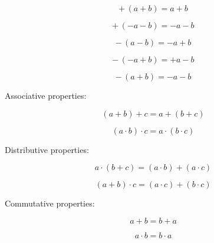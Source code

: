 \vspace{0.5cm}\begin{definition}\label{def-parentheses}
    
    \begin{equation}
    +\,(a+b) = a+b \label{eq-20}
    \end{equation}

    \begin{equation}
        +\,(-a-b) = -a-b \label{eq-21}
    \end{equation}

    \begin{equation}
        -\,(a-b) = -a+b \label{eq-22}
    \end{equation}

    \begin{equation}
        -\,(-a+b) = +a-b \label{eq-23}
    \end{equation}

    \begin{equation}
        -\,(a+b) = -a-b \label{eq-24}
    \end{equation}

    \flushleft \normalfont Associative properties:

    \begin{equation}
        (a+b)+c = a+(b+c) \label{eq-25}
    \end{equation}

    \begin{equation}
        (a \cdot b) \cdot c = a \cdot (b \cdot c) \label{eq-26}
    \end{equation}

    Distributive properties: 

    \begin{equation}
        a \cdot (b+c) = (a \cdot b) + (a \cdot c) \label{eq-27}
    \end{equation}

    \begin{equation}
        (a+b) \cdot c = (a \cdot c) + (b \cdot c) \label{eq-28}
    \end{equation}

    Commutative properties:

    \begin{equation}
        a+b = b+a \label{eq-29}
    \end{equation}

    \begin{equation}
        a \cdot b = b \cdot a \label{eq-30}
    \end{equation}

\end{definition}

